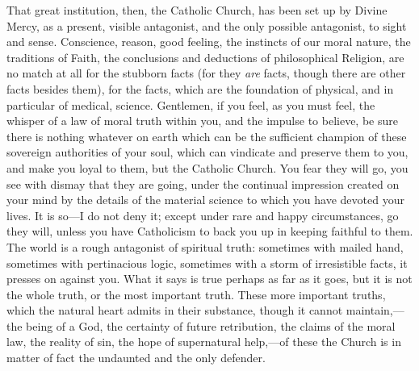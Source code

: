 That great institution, then, the Catholic Church, has been set up
by Divine Mercy, as a present, visible antagonist, and the only
possible antagonist, to sight and sense. Conscience, reason, good
feeling, the instincts of our moral nature, the traditions of Faith,
the conclusions and deductions of philosophical Religion, are no match
at all for the stubborn facts (for they \emph{are} facts, though there
are other facts besides them), for the facts, which are the foundation
of physical, and in particular of medical, science. Gentlemen, if you
feel, as you must feel, the whisper of a law of moral truth within
you, and the impulse to believe, be sure there is nothing whatever on
earth which can be the sufficient champion of these sovereign
authorities of your soul, which can vindicate and preserve them to
you, and make you loyal to them, but the Catholic Church. You fear
they will go, you see with dismay that they are going, under the
continual impression created on your mind by the details of the
material science to which you have devoted your lives. It is so—I do
not deny it; except under rare and happy circumstances, go they will,
unless you have Catholicism to back you up in keeping faithful to
them. The world is a rough antagonist of spiritual truth: sometimes
with mailed hand, sometimes with pertinacious logic, sometimes with a
storm of irresistible facts, it presses on against you. What it says
is true perhaps as far as it goes, but it is not the whole truth, or
the most important truth. These more important truths, which the
natural heart admits in their substance, though it cannot maintain,—the
being of a God, the certainty of future retribution, the claims of the
moral law, the reality of sin, the hope of supernatural help,—of
these the Church is in matter of fact the undaunted and the only
defender.

